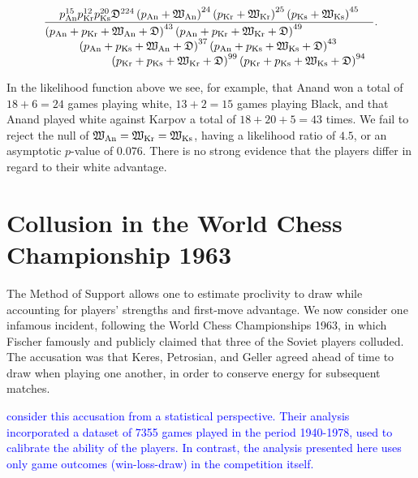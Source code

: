 \documentclass[review]{elsarticle}
\begin{document}
\begin{equation}\label{KKA_personalised_whitemonster}
\frac{
p_\mathrm{An}^{15}
p_\mathrm{Kr}^{12}
p_\mathrm{Ks}^{20}
\draw^{224}
\left(p_\mathrm{An} + \white_\mathrm{An}\right)^{24}%
\left(p_\mathrm{Kr} + \white_\mathrm{Kr}\right)^{25}
\left(p_\mathrm{Ks} + \white_\mathrm{Ks}\right)^{45}
}{\parbox{4in}{$
\left(p_\mathrm{An} + p_\mathrm{Kr} + \white_\mathrm{An} +  \draw\right)^{43}
\left(p_\mathrm{An} + p_\mathrm{Kr} + \white_\mathrm{Kr} +  \draw\right)^{49}\\ \rule{10mm}{0mm}
\left(p_\mathrm{An} + p_\mathrm{Ks} + \white_\mathrm{An} +  \draw\right)^{37}
\left(p_\mathrm{An} + p_\mathrm{Ks} + \white_\mathrm{Ks} +  \draw\right)^{43}\\ \rule{20mm}{0mm}
\left(p_\mathrm{Kr} + p_\mathrm{Ks} + \white_\mathrm{Kr} +  \draw\right)^{99}
\left(p_\mathrm{Kr} + p_\mathrm{Ks} + \white_\mathrm{Ks} +  \draw\right)^{94}
$}}.
\end{equation}

In the likelihood function above we see, for example, that Anand won a
total of $18+6=24$ games playing white, $13+2=15$ games playing Black,
and that Anand played white against Karpov a total of $18+20+5=43$
times.  We fail to reject the null of
$\mathfrak{W}_\mathrm{An}=\mathfrak{W}_\mathrm{Kr}=\mathfrak{W}_\mathrm{Ks}$, having a
likelihood ratio of $4.5$, or an asymptotic $p$-value of $0.076$.
There is no strong evidence that the players differ in regard to their
white advantage.


\section{Collusion in the World Chess Championship 1963}

The Method of Support allows one to estimate proclivity to draw while
accounting for players' strengths and first-move advantage.  We now
consider one infamous incident, following the World Chess
Championships 1963, in which Fischer famously and publicly claimed
that three of the Soviet players colluded.  The accusation was that
Keres, Petrosian, and Geller agreed ahead of time to draw when playing
one another, in order to conserve energy for subsequent matches.

\textcolor{blue}{\citet{moul2009} consider this accusation from a
  statistical perspective.  Their analysis incorporated a dataset of
  7355 games played in the period 1940-1978, used to calibrate the
  ability of the players.  In contrast, the analysis presented here
  uses only game outcomes (win-loss-draw) in the competition itself.}
\end{document}
